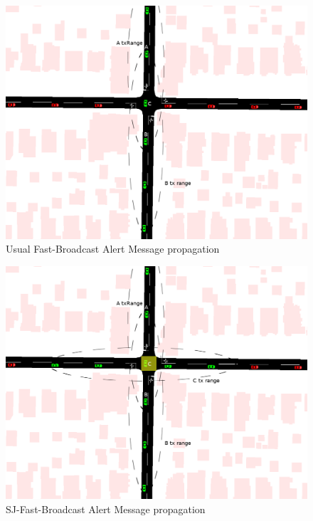 		\begin{figure}[H]
			\centering
			\includegraphics[width=\textwidth]{immagini/fb-junction-0}
			\caption{Usual Fast-Broadcast Alert Message propagation}
			\label{fig:fb-junction-0}
		\end{figure}
	
		\begin{figure}[H]
			\centering
			\includegraphics[width=\textwidth]{immagini/fb-junction-1}
			\caption{SJ-Fast-Broadcast Alert Message propagation}
			\label{fig:fb-junction-1}
		\end{figure}
		
